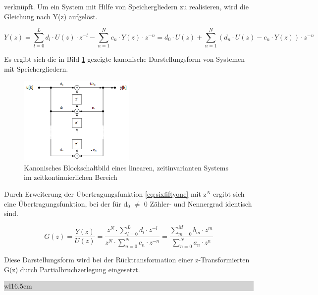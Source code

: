 \noindent verkn\"{u}pft. Um ein System mit Hilfe von Speichergliedern zu realisieren, wird die Gleichung nach Y(z) aufgel\"{o}st.

\begin{equation}\label{eq:sixfiftytwo}
Y\left(z\right)=\sum _{l=0}^{L}d_{l} \cdot U\left(z\right)\cdot z^{-l}  -\sum _{n=1}^{N}c_{n} \cdot Y\left(z\right)\cdot z^{-n}  =d_{0} \cdot U\left(z\right)+\sum _{n=1}^{N}\left(d_{n} \cdot U\left(z\right)-c_{n} \cdot Y\left(z\right)\right)\cdot z^{-n}   
\end{equation}

\noindent Es ergibt sich die in Bild \ref{fig:SignalflussDirektstruktur2Laplace} gezeigte kanonische Darstellungsform von Systemen mit Speichergliedern.

\begin{figure}[H]
  \centerline{\includegraphics[width=0.5\textwidth]{Kapitel6/Bilder/image5.png}}
  \caption{Kanonisches Blockschaltbild eines linearen, zeitinvarianten Systems im zeitkontinuierlichen Bereich}
  \label{fig:SignalflussDirektstruktur2Laplace}
\end{figure}

\noindent Durch Erweiterung der \"{U}bertragungsfunktion \eqref{eq:sixfiftyone} mit z${}^{N}$ ergibt sich eine \"{U}bertragungsfunktion, bei der f\"{u}r d${}_{0}$ $\neq$ 0 Z\"{a}hler- und Nennergrad identisch sind.

\begin{equation}\label{eq:sixfiftythree}
G\left(z\right)=\frac{Y\left(z\right)}{U\left(z\right)} =\frac{z^{N} \cdot \sum _{l=0}^{L}d_{l} \cdot z^{-l}  }{z^{N} \cdot \sum _{n=0}^{N}c_{n} \cdot z^{-n}  } =\frac{\sum _{m=0}^{M}b_{m} \cdot z^{m}  }{\sum _{n=0}^{N}a_{n} \cdot z^{n}  } 
\end{equation}

\noindent Diese Darstellungsform wird bei der R\"{u}cktransformation einer z-Transformierten G(z) durch Partialbruchzerlegung eingesetzt. \bigskip

\noindent
\colorbox{lightgray}{%
%
\renewcommand\arraystretch{0.6}%
\begin{tabular}{ wl{16.5cm} }
{}
\end{tabular}%
}\medskip

